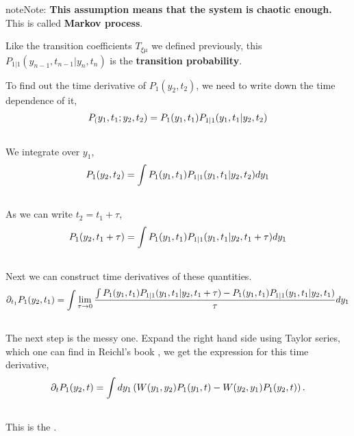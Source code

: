 \documentclass[letterpaper,10pt,english]{sphinxmanual}
\begin{document}
\begin{notice}{note}{Note:}
\textbf{This assumption means that the system is chaotic enough.} This is called \textbf{Markov process}.

Like the transition coefficients $T_{\xi\mu}$ we defined previously, this $P_{1|1}(y_{n-1},t_{n-1}|y_n,t_n)$ is the \textbf{transition probability}.

To find out the time derivative of $P_1(y_2,t_2)$, we need to write down the time dependence of it,
\begin{gather}
\begin{split}P_(y_1,t_1;y_2,t_2) = P_1(y_1,t_1) P_{1|1}(y_1,t_1|y_2,t_2)\end{split}\notag\\\begin{split}\end{split}\notag
\end{gather}
We integrate over $y_1$,
\begin{gather}
\begin{split}P_1(y_2,t_2) = \int P_1(y_1,t_1)P_{1|1}(y_1,t_1|y_2,t_2)dy_1\end{split}\notag\\\begin{split}\end{split}\notag
\end{gather}
As we can write $t_2=t_1+\tau$,
\begin{gather}
\begin{split}P_1(y_2,t_1+\tau) = \int P_1(y_1,t_1) P _ {1|1}(y_1,t_1|y_2,t_1+\tau) dy_1\end{split}\notag\\\begin{split}\end{split}\notag
\end{gather}
Next we can construct time derivatives of these quantities.
\begin{gather}
\begin{split}\partial_{t_1} P_1(y_2,t_1) = \int \lim_{\tau\rightarrow 0} \frac{\int P_1(y_1,t_1) P _ {1|1}(y_1,t_1|y_2,t_1+\tau) - P_1(y_1,t_1) P _ {1|1}(y_1,t_1|y_2,t_1) }{\tau} dy_1\end{split}\notag\\\begin{split}\end{split}\notag
\end{gather}
The next step is the messy one. Expand the right hand side using Taylor series, which one can find in Reichl's book \footnotemark[1] , we get the expression for this time derivative,
\begin{gather}
\begin{split}\partial_{t} P_1(y_2,t) = \int dy_1 \left( W(y_1,y_2)P_1(y_1,t) - W(y_2,y_1)P_1(y_2,t) \right) .\end{split}\notag\\\begin{split}\end{split}\notag
\end{gather}
This is the .


\end{notice}
\end{document}
